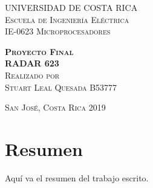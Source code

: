 \documentclass[12pt,letterpaper]{report} %
\begin{document}
\begin{titlepage}
\begin{center}

\textsc{\Large UNIVERSIDAD DE COSTA RICA}\\[2em]
\textsc{\Large Escuela de Ingeniería Eléctrica}\\[2em]
\textsc{\Large IE-0623 Microprocesadores}\\[5em]


\vspace{4em}

\textsc{\huge \textbf{Proyecto Final}}\\[2em]
\textsc{\huge \textbf{RADAR 623}}\\[8em]


\textsc{Realizado por}\\[1em]


\textsc{ \large Stuart Leal Quesada B53777}\\[1em]


\end{center}

\vspace*{\fill}
\textsc{San José, Costa Rica \hspace*{\fill} 2019}


\end{titlepage}
\section*{Resumen}
Aquí va el resumen del trabajo escrito.
\tableofcontents
\listoffigures
\listoftables

\end{document}

